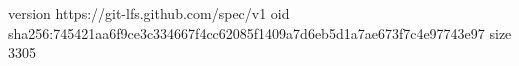 version https://git-lfs.github.com/spec/v1
oid sha256:745421aa6f9ce3c334667f4cc62085f1409a7d6eb5d1a7ae673f7c4e97743e97
size 3305
